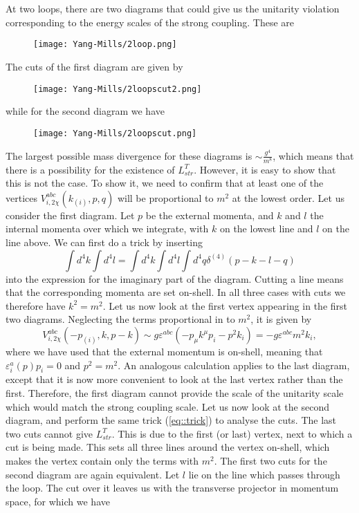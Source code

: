 \documentclass{article}
\begin{document}
\\\\
At two loops, there are two diagrams that could give us the unitarity violation corresponding to the energy scales of the strong coupling. These are
\begin{figure}[H]
\texttt{[image: Yang-Mills/2loop.png]}
\centering
\end{figure}
The cuts of the first diagram are given by 
\begin{figure}[H]
\texttt{[image: Yang-Mills/2loopscut2.png]}
\centering
\end{figure}
while for the second diagram we have 
\begin{figure}[H]
\texttt{[image: Yang-Mills/2loopscut.png]}
\centering
\end{figure}
The largest possible mass divergence for these diagrams is $\sim\frac{g^4}{m^8}$, which means that there is a possibility for the existence of  $L^T_{str}$. However, it is easy to show that this is not the case. To show it, we need to confirm that at least one of the vertices $V_{i,2\chi}^{abc}(k_{(i)},p,q)$ will be proportional to $m^2$ at the lowest order. Let us consider the first diagram. Let $p$ be the external momenta, and $k$ and $l$ the internal momenta over which we integrate, with $k$ on the lowest line and $l$ on the line above. We can first do a trick by inserting 
\begin{equation}\label{eq::trick}
    \int d^4k\int d^4l=\int d^4k\int d^4l\int d^4q \delta^{(4)}\left(p-k-l-q\right)
\end{equation}
into the expression for the imaginary part of the diagram. Cutting a line means that the corresponding momenta are set  on-shell. In all three cases with cuts we therefore have $k^2=m^2$. Let us now look at the first vertex appearing in the first two diagrams. Neglecting the terms proportional in to $m^2$, it is given by
\begin{equation}
    V_{i,2\chi}^{abc}(-p_{(i)},k,p-k)\sim g\varepsilon^{abc}\left(-p_{\mu}k^{\mu}p_i-p^2k_i\right)=-g\varepsilon^{abc}m^2k_i,
\end{equation}
where we have used that the external momentum is on-shell, meaning that $\varepsilon_i^a(p)p_i=0$ and $p^2=m^2$. 
An analogous calculation applies to the last diagram, except that it is now more convenient to look at the last vertex rather than the first. Therefore, the first diagram cannot provide the scale of the unitarity scale which would match the strong coupling scale. Let us now look at the second diagram, and perform the same trick (\ref{eq::trick}) to analyse the cuts. The last two cuts cannot give $L^T_{str}$. This is due to the first (or last) vertex, next to which a cut is being made. This sets all three lines around the vertex on-shell, which makes the vertex contain only the terms with $m^2$. The first two cuts for the second diagram are again equivalent. Let $l$ lie on the line which passes through the loop. The cut over it leaves us with the transverse projector in momentum space, for which we have 
\end{document}
